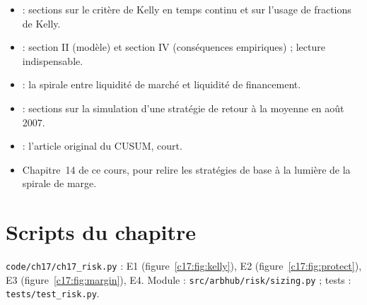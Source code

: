 \begin{toread}
\begin{itemize}[leftmargin=1.2em]
\item \citet{thorp2006} : sections sur le critère de Kelly en temps continu et sur l'usage de fractions de Kelly.
\item \citet{shleifer1997} : section II (modèle) et section IV (conséquences empiriques) ; lecture indispensable.
\item \citet{brunnermeier2009} : la spirale entre liquidité de marché et liquidité de financement.
\item \citet{khandanilo2011} : sections sur la simulation d'une stratégie de retour à la moyenne en août 2007.
\item \citet{page1954} : l'article original du CUSUM, court.
\item Chapitre~14 de ce cours, pour relire les stratégies de base à la lumière de la spirale de marge.
\end{itemize}
\end{toread}

\section{Scripts du chapitre}
\sloppy\noindent\texttt{code/ch17/ch17\_risk.py} : E1 (figure~\ref{c17:fig:kelly}), E2 (figure~\ref{c17:fig:protect}), E3 (figure~\ref{c17:fig:margin}), E4. Module : \texttt{src/arbhub/risk/sizing.py} ; tests : \texttt{tests/test\_risk.py}.
